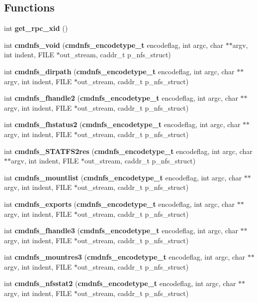 \subsection*{Functions}
\begin{CompactItemize}
\item 
int {\bf get\_\-rpc\_\-xid} ()
\item 
int {\bf cmdnfs\_\-void} ({\bf cmdnfs\_\-encodetype\_\-t} encodeflag, int argc, char $\ast$$\ast$argv, int indent, FILE $\ast$out\_\-stream, caddr\_\-t p\_\-nfs\_\-struct)
\item 
int {\bf cmdnfs\_\-dirpath} ({\bf cmdnfs\_\-encodetype\_\-t} encodeflag, int argc, char $\ast$$\ast$argv, int indent, FILE $\ast$out\_\-stream, caddr\_\-t p\_\-nfs\_\-struct)
\item 
int {\bf cmdnfs\_\-fhandle2} ({\bf cmdnfs\_\-encodetype\_\-t} encodeflag, int argc, char $\ast$$\ast$argv, int indent, FILE $\ast$out\_\-stream, caddr\_\-t p\_\-nfs\_\-struct)
\item 
int {\bf cmdnfs\_\-fhstatus2} ({\bf cmdnfs\_\-encodetype\_\-t} encodeflag, int argc, char $\ast$$\ast$argv, int indent, FILE $\ast$out\_\-stream, caddr\_\-t p\_\-nfs\_\-struct)
\item 
int {\bf cmdnfs\_\-STATFS2res} ({\bf cmdnfs\_\-encodetype\_\-t} encodeflag, int argc, char $\ast$$\ast$argv, int indent, FILE $\ast$out\_\-stream, caddr\_\-t p\_\-nfs\_\-struct)
\item 
int {\bf cmdnfs\_\-mountlist} ({\bf cmdnfs\_\-encodetype\_\-t} encodeflag, int argc, char $\ast$$\ast$argv, int indent, FILE $\ast$out\_\-stream, caddr\_\-t p\_\-nfs\_\-struct)
\item 
int {\bf cmdnfs\_\-exports} ({\bf cmdnfs\_\-encodetype\_\-t} encodeflag, int argc, char $\ast$$\ast$argv, int indent, FILE $\ast$out\_\-stream, caddr\_\-t p\_\-nfs\_\-struct)
\item 
int {\bf cmdnfs\_\-fhandle3} ({\bf cmdnfs\_\-encodetype\_\-t} encodeflag, int argc, char $\ast$$\ast$argv, int indent, FILE $\ast$out\_\-stream, caddr\_\-t p\_\-nfs\_\-struct)
\item 
int {\bf cmdnfs\_\-mountres3} ({\bf cmdnfs\_\-encodetype\_\-t} encodeflag, int argc, char $\ast$$\ast$argv, int indent, FILE $\ast$out\_\-stream, caddr\_\-t p\_\-nfs\_\-struct)
\item 
int {\bf cmdnfs\_\-nfsstat2} ({\bf cmdnfs\_\-encodetype\_\-t} encodeflag, int argc, char $\ast$$\ast$argv, int indent, FILE $\ast$out\_\-stream, caddr\_\-t p\_\-nfs\_\-struct)
\item 

\end{CompactItemize}
